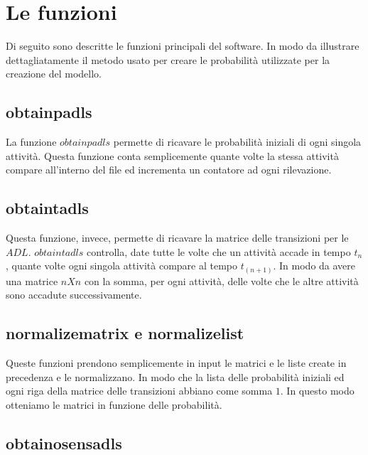 \documentclass[11pt, a4paper]{scrartcl}
\begin{document}
\section*{Le funzioni}
Di seguito sono descritte le funzioni principali del software. In modo da illustrare dettagliatamente il metodo usato per creare le probabilità utilizzate per la creazione del modello.

\subsection*{obtainpadls}
La funzione $obtainpadls$ permette di ricavare le probabilità iniziali di ogni singola attività. Questa funzione conta semplicemente quante volte la stessa attività compare all'interno del file ed incrementa un contatore ad ogni rilevazione.

\subsection*{obtaintadls}
Questa funzione, invece, permette di ricavare la matrice delle transizioni per le $ADL$. $obtaintadls$ controlla, date tutte le volte che un attività accade in tempo $t_n$, quante volte ogni singola attività compare al tempo $t_(n+1)$. In modo da avere una matrice $nXn$ con la somma, per ogni attività, delle volte che le altre attività sono accadute successivamente.

\subsection*{normalizematrix e normalizelist}
Queste funzioni prendono semplicemente in  input le matrici e le liste create in precedenza e le normalizzano. In modo che la lista delle probabilità iniziali ed ogni riga della matrice delle transizioni abbiano come somma $1$. In questo modo otteniamo le matrici in funzione delle probabilità.

\subsection*{obtainosensadls}
\end{document}
